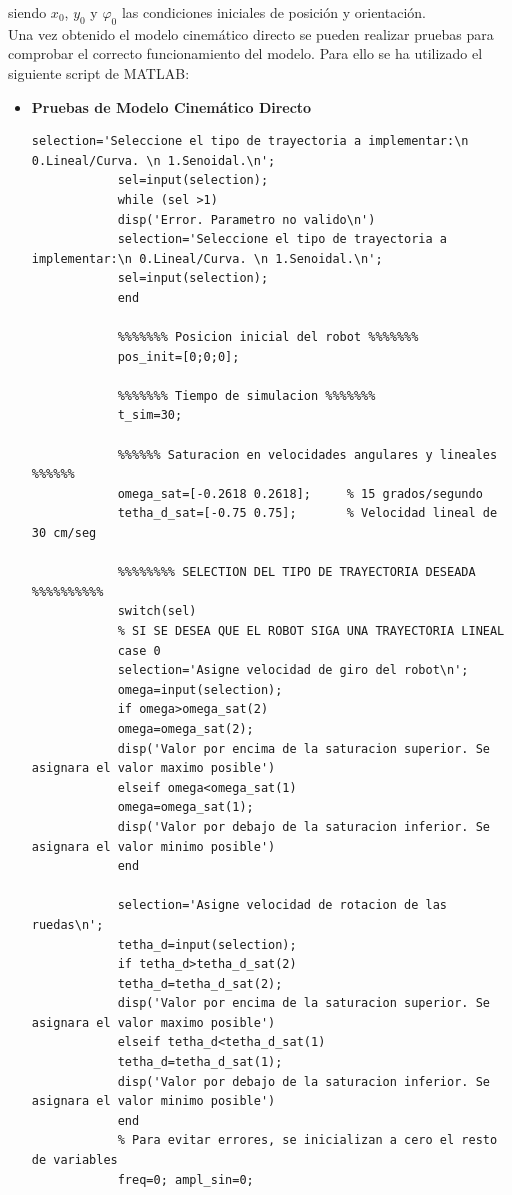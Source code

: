 \documentclass[a4paper,twoside]{article}
\begin{document}
	siendo $x_0$, $y_0$ y $\varphi_0$ las condiciones iniciales de posición y orientación.\\

	Una vez obtenido el modelo cinemático directo se pueden realizar pruebas para comprobar el correcto funcionamiento del modelo. Para ello se ha utilizado el siguiente script de MATLAB:
	
	\begin{itemize}
		\item \textbf{Pruebas de Modelo Cinemático Directo} 
		\lstset{language=Matlab,columns=flexible,keepspaces=true}
		
			\begin{lstlisting}[frame=single]
			selection='Seleccione el tipo de trayectoria a implementar:\n 0.Lineal/Curva. \n 1.Senoidal.\n';
			sel=input(selection);
			while (sel >1) 
			disp('Error. Parametro no valido\n') 
			selection='Seleccione el tipo de trayectoria a implementar:\n 0.Lineal/Curva. \n 1.Senoidal.\n';
			sel=input(selection);
			end
			
			%%%%%%% Posicion inicial del robot %%%%%%%
			pos_init=[0;0;0];
			
			%%%%%%% Tiempo de simulacion %%%%%%%
			t_sim=30;
			
			%%%%%% Saturacion en velocidades angulares y lineales %%%%%%
			omega_sat=[-0.2618 0.2618];     % 15 grados/segundo
			tetha_d_sat=[-0.75 0.75];       % Velocidad lineal de 30 cm/seg
			
			%%%%%%%% SELECTION DEL TIPO DE TRAYECTORIA DESEADA %%%%%%%%%%
			switch(sel)
			% SI SE DESEA QUE EL ROBOT SIGA UNA TRAYECTORIA LINEAL
			case 0
			selection='Asigne velocidad de giro del robot\n';
			omega=input(selection);
			if omega>omega_sat(2)
			omega=omega_sat(2);
			disp('Valor por encima de la saturacion superior. Se asignara el valor maximo posible')
			elseif omega<omega_sat(1)
			omega=omega_sat(1);
			disp('Valor por debajo de la saturacion inferior. Se asignara el valor minimo posible')
			end
			
			selection='Asigne velocidad de rotacion de las ruedas\n';
			tetha_d=input(selection);
			if tetha_d>tetha_d_sat(2)
			tetha_d=tetha_d_sat(2);
			disp('Valor por encima de la saturacion superior. Se asignara el valor maximo posible')
			elseif tetha_d<tetha_d_sat(1)
			tetha_d=tetha_d_sat(1);
			disp('Valor por debajo de la saturacion inferior. Se asignara el valor minimo posible')
			end
			% Para evitar errores, se inicializan a cero el resto de variables
			freq=0; ampl_sin=0;
			

\end{lstlisting}
\end{itemize}
\end{document}

